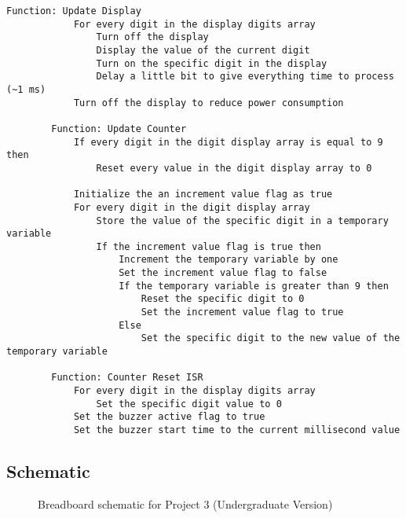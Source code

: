 \begin{lstlisting}[linewidth=1.5\textwidth]
        Function: Update Display
            For every digit in the display digits array
                Turn off the display
                Display the value of the current digit
                Turn on the specific digit in the display
                Delay a little bit to give everything time to process (~1 ms)
            Turn off the display to reduce power consumption

        Function: Update Counter
            If every digit in the digit display array is equal to 9 then
                Reset every value in the digit display array to 0
             
            Initialize the an increment value flag as true
            For every digit in the digit display array
                Store the value of the specific digit in a temporary variable
                If the increment value flag is true then
                    Increment the temporary variable by one
                    Set the increment value flag to false
                    If the temporary variable is greater than 9 then
                        Reset the specific digit to 0
                        Set the increment value flag to true
                    Else
                        Set the specific digit to the new value of the temporary variable
        
        Function: Counter Reset ISR
            For every digit in the display digits array
                Set the specific digit value to 0
            Set the buzzer active flag to true
            Set the buzzer start time to the current millisecond value
    \end{lstlisting}

    \subsection*{Schematic}
    \begin{figure*}[ht!]
        \caption{Breadboard schematic for Project 3 (Undergraduate Version)}
    \end{figure*}

